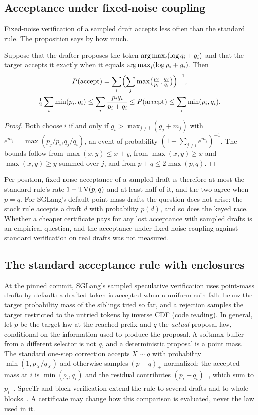 \subsection{Acceptance under fixed-noise coupling}\label{app:coupling}
Fixed-noise verification of a sampled draft accepts less often than the standard rule. The proposition says by how much.
\begin{proposition}\label{prop:coupling}
Suppose that the drafter proposes the token $\operatorname*{arg\,max}_i(\log q_i+g_i)$ and that the target accepts it exactly when it equals $\operatorname*{arg\,max}_i(\log p_i+g_i)$. Then
\begin{gather*}
P(\mathrm{accept})=\sum_i\Bigl(\sum_j\max\bigl(\tfrac{p_j}{p_i},\tfrac{q_j}{q_i}\bigr)\Bigr)^{-1},\\
\tfrac12\sum_i\min(p_i,q_i)\le\sum_i\frac{p_iq_i}{p_i+q_i}\le P(\mathrm{accept})\le\sum_i\min(p_i,q_i).
\end{gather*}
\end{proposition}
\begin{proof}
Both choose $i$ if and only if $g_i>\max_{j\ne i}(g_j+m_j)$ with $e^{m_j}=\max(p_j/p_i,q_j/q_i)$, an event of probability $(1+\sum_{j\ne i}e^{m_j})^{-1}$. The bounds follow from $\max(x,y)\le x+y$, from $\max(x,y)\ge x$ and $\max(x,y)\ge y$ summed over $j$, and from $p+q\le2\max(p,q)$.
\end{proof}
Per position, fixed-noise acceptance of a sampled draft is therefore at most the standard rule's rate $1-\operatorname{TV}(p,q)$ and at least half of it, and the two agree when $p=q$. For SGLang's default point-mass drafts the question does not arise: the stock rule accepts a draft $d$ with probability $p(d)$, and so does the keyed race. Whether a cheaper certificate pays for any lost acceptance with sampled drafts is an empirical question, and the acceptance under fixed-noise coupling against standard verification on real drafts was not measured.

\subsection{The standard acceptance rule with enclosures}\label{app:guards}\label{sec:guards}\label{sec:standard-rule}
At the pinned commit, SGLang's sampled speculative verification uses point-mass drafts by default: a drafted token is accepted when a uniform coin falls below the target probability mass of the siblings tried so far, and a rejection samples the target restricted to the untried tokens by inverse CDF (code reading). In general, let $p$ be the target law at the reached prefix and $q$ the \emph{actual} proposal law, conditional on the information used to produce the proposal. A softmax buffer from a different selector is not $q$, and a deterministic proposal is a point mass. The standard one-step correction accepts $X\sim q$ with probability $\min(1,p_X/q_X)$ and otherwise samples $(p-q)_+$ normalized; the accepted mass at $i$ is $\min(p_i,q_i)$ and the residual contributes $(p_i-q_i)_+$, which sum to $p_i$~\cite{specdecode,chen2023specsampling}. SpecTr and block verification extend the rule to several drafts and to whole blocks~\cite{spectr,blockverify}. A certificate may change how this comparison is evaluated, never the law used in it.

